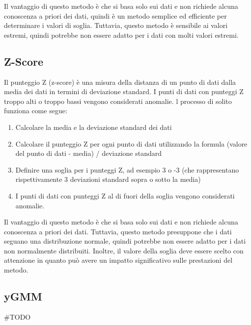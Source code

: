 Il vantaggio di questo metodo è che si basa solo sui dati e non richiede alcuna conoscenza a priori dei dati, quindi è un metodo semplice ed efficiente per determinare i valori di soglia. Tuttavia, questo metodo è sensibile ai valori estremi, quindi potrebbe non essere adatto per i dati con molti valori estremi.

\subsection{Z-Score}
Il punteggio Z (z-score) è una misura della distanza di un punto di dati dalla media dei dati in termini di deviazione standard. I punti di dati con punteggi Z troppo alti o troppo bassi vengono considerati anomalie.
l processo di solito funziona come segue:
\begin{enumerate}
\item Calcolare la media e la deviazione standard dei dati
\item Calcolare il punteggio Z per ogni punto di dati utilizzando la formula (valore del punto di dati - media) / deviazione standard
\item Definire una soglia per i punteggi Z, ad esempio 3 o -3 (che rappresentano rispettivamente 3 deviazioni standard sopra o sotto la media)
\item I punti di dati con punteggi Z al di fuori della soglia vengono considerati anomalie.
\end{enumerate}
Il vantaggio di questo metodo è che si basa solo sui dati e non richiede alcuna conoscenza a priori dei dati. Tuttavia, questo metodo presuppone che i dati seguano una distribuzione normale, quindi potrebbe non essere adatto per i dati non normalmente distribuiti. Inoltre, il valore della soglia deve essere scelto con attenzione in quanto può avere un impatto significativo sulle prestazioni del metodo.


\subsection{yGMM}
\#TODO